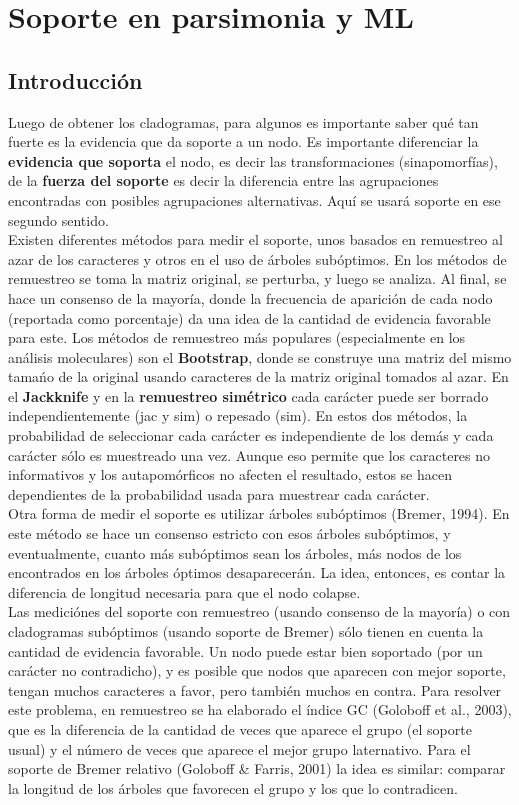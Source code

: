 \chapter{Soporte en parsimonia y ML}
\section*{Introducci\'on}
\label{ch:soporte.pars}
Luego de obtener los cladogramas, para algunos es importante saber qu\'e tan fuerte es la evidencia que da soporte a un nodo. Es importante diferenciar la \textbf{evidencia que soporta} el nodo, es decir las transformaciones (sinapomorf\'ias), de la \textbf{fuerza del soporte} es decir la diferencia entre las agrupaciones encontradas con posibles agrupaciones alternativas. Aqu\'i se usar\'a soporte en ese segundo sentido.\\
Existen diferentes m\'etodos para medir el soporte, unos basados en remuestreo al azar de los caracteres y otros en el uso de \'arboles sub\'optimos. En los m\'etodos de remuestreo se toma la matriz original, se perturba, y luego se analiza. Al final, se hace un consenso de la mayor\'ia, donde la frecuencia de aparici\'on de cada nodo (reportada como porcentaje) da una idea de la cantidad de evidencia favorable para este. Los m\'etodos de remuestreo m\'as populares (especialmente en los an\'alisis moleculares) son el \textbf{Bootstrap}, donde se construye una matriz del mismo tama\'no de la original usando caracteres de la matriz original tomados al azar. En el \textbf{Jackknife} y en la \textbf{remuestreo sim\'etrico} cada car\'acter puede ser borrado independientemente (jac y sim) o repesado (sim). En estos dos m\'etodos, la probabilidad de seleccionar cada car\'acter es independiente de los dem\'as y cada car\'acter s\'olo es muestreado una vez. Aunque eso permite que los caracteres no informativos y los autapom\'orficos no afecten el resultado, estos se hacen dependientes de la probabilidad usada para muestrear cada car\'acter.\\
Otra forma de medir el soporte es utilizar \'arboles sub\'optimos (Bremer, 1994). En este m\'etodo se hace un consenso estricto con esos \'arboles sub\'optimos, y eventualmente, cuanto m\'as sub\'optimos sean los \'arboles, m\'as nodos de los encontrados en los \'arboles \'optimos desaparecer\'an. La idea, entonces, es contar la diferencia de longitud necesaria para que el nodo colapse.\\
Las medici\'ones del soporte con remuestreo (usando consenso de la mayor\'ia) o con cladogramas sub\'optimos (usando soporte de Bremer) s\'olo tienen en cuenta la cantidad de evidencia favorable. Un nodo puede estar bien soportado (por un car\'acter no contradicho), y es posible que nodos que aparecen con mejor soporte, tengan muchos caracteres a favor, pero tambi\'en muchos en contra. Para resolver este problema, en remuestreo se ha elaborado el \'indice GC (Goloboff et al., 2003), que es la diferencia de la cantidad de veces que aparece el grupo (el soporte usual) y el n\'umero de veces que aparece el mejor grupo laternativo. Para el soporte de Bremer relativo (Goloboff \& Farris, 2001) la idea es similar: comparar la longitud de los \'arboles que favorecen el grupo y los que lo contradicen.\\
